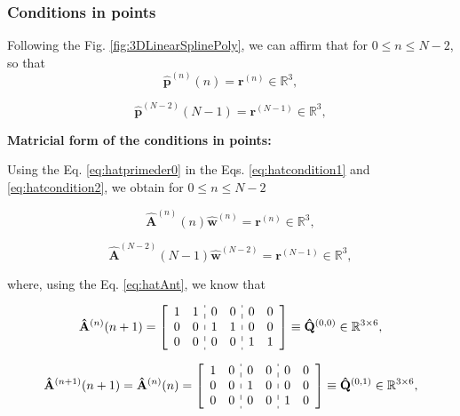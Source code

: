\subsubsection{Conditions in points}

Following the Fig. \ref{fig:3DLinearSplinePoly}, 
we can affirm that for $0 \leq n\leq N-2$,
so that
\begin{equation}\label{eq:hatcondition1}
\mathbf{\hat{p}}^{(n)}(n)=\mathbf{r}^{(n)}
\in \mathbb{R}^{3},
\end{equation}

\begin{equation}\label{eq:hatcondition2}
\mathbf{\hat{p}}^{(N-2)}(N-1)=\mathbf{r}^{(N-1)}
\in \mathbb{R}^{3},
\end{equation}

\textbf{Matricial form of the conditions in points:}

Using 
the Eq. \ref{eq:hatprimeder0} in 
the Eqs. \ref{eq:hatcondition1} and \ref{eq:hatcondition2},
we obtain for $0 \leq n\leq N-2$

\begin{equation}\label{eq:hatpointcond1}
\mathbf{\hat{A}}^{(n)}(n) \mathbf{\hat{w}}^{(n)}=\mathbf{r}^{(n)}
\in \mathbb{R}^{3},
\end{equation}

\begin{equation}\label{eq:hatpointcond2}
\mathbf{\hat{A}}^{(N-2)}(N-1) \mathbf{\hat{w}}^{(N-2)}=\mathbf{r}^{(N-1)}
\in \mathbb{R}^{3},
\end{equation}


where, using the Eq. \ref{eq:hatAnt}, we know that

\begin{equation}\label{eq:hatQ00}
\mathbf{\hat{A}}^{(n)}(n+1)=
\left[
\begin{array}{cc:cc:cc}
1 & 1 & 0 & 0 & 0 & 0 \\
0 & 0 & 1 & 1 & 0 & 0 \\
0 & 0 & 0 & 0 & 1 & 1 
\end{array}
\right]
\equiv \mathbf{\hat{Q}}^{(0,0)}\in \mathbb{R}^{3\times 6},
\end{equation}

\begin{equation}\label{eq:hatQ01}
\mathbf{\hat{A}}^{(n+1)}(n+1)
=
\mathbf{\hat{A}}^{(n)}(n)
=
\left[
\begin{array}{cc:cc:cc}
1 & 0 & 0 & 0 & 0 & 0 \\
0 & 0 & 1 & 0 & 0 & 0 \\
0 & 0 & 0 & 0 & 1 & 0 
\end{array}
\right]
\equiv \mathbf{\hat{Q}}^{(0,1)}\in \mathbb{R}^{3\times 6},
\end{equation}

